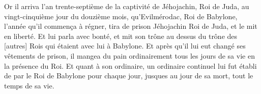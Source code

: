 \begin{multicols}{2}
Or il arriva l'an trente-septième de la captivité de Jéhojachin, Roi de Juda, au vingt-cinquième jour du douzième mois, qu'Evilmérodac, Roi de Babylone, l'année qu'il commença à régner, tira de prison Jéhojachin Roi de Juda, et le mit en liberté.
Et lui parla avec bonté, et mit son trône au dessus du trône des [autres] Rois qui étaient avec lui à Babylone.
Et après qu'il lui eut changé ses vêtements de prison, il mangea du pain ordinairement tous les jours de sa vie en la présence du Roi.
Et quant à son ordinaire, un ordinaire continuel lui fut établi de par le Roi de Babylone pour chaque jour, jusques au jour de sa mort, tout le temps de sa vie.
\PPE{}
\end{multicols}

